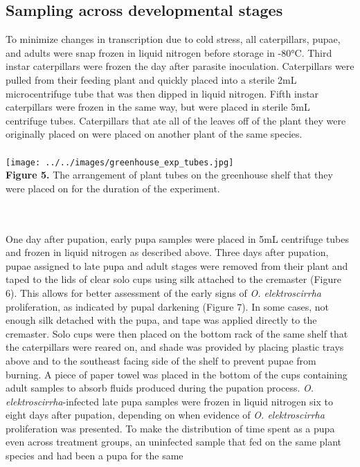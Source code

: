 \documentclass{article}
\begin{document}
\begin{multicols}{2}
    \section{Sampling across developmental stages}
    \indent To minimize changes in transcription due to cold stress, all caterpillars, pupae, and adults were snap frozen in liquid nitrogen before 
    storage in -80°C. Third instar caterpillars were frozen the day after parasite inoculation. Caterpillars were pulled from their feeding plant 
    and quickly placed into a sterile 2mL microcentrifuge tube that was then dipped in liquid nitrogen. Fifth instar caterpillars were frozen in 
    the same way, but were placed in sterile 5mL centrifuge tubes. Caterpillars that ate all of the leaves off of the plant they were originally 
    placed on were placed on another plant of the same species. 
    \\
    \\
    \texttt{[image: ../../images/greenhouse\_exp\_tubes.jpg]} \\
    \caption{\textbf{Figure 5.} The arrangement of plant tubes on the greenhouse shelf that they were placed on for the duration of the experiment.}\\
    \\
    \indent One day after pupation, early pupa samples were placed in 5mL centrifuge tubes and frozen in liquid nitrogen as described above. 
    Three days after pupation, pupae assigned to late pupa and adult stages were removed from their plant and taped to the lids of clear solo cups 
    using silk attached to the cremaster (Figure 6). This allows for better assessment of the early signs of \emph{O. elektroscirrha} proliferation, as indicated by 
    pupal darkening (Figure 7). In some cases, not enough silk detached with the pupa, and tape was applied directly to the cremaster. Solo cups were then 
    placed on the bottom rack of the same shelf that the caterpillars were reared on, and shade was provided by placing plastic trays above and to 
    the southeast facing side of the shelf to prevent pupae from burning. A piece of paper towel was placed in the bottom of the cups containing 
    adult samples to absorb fluids produced during the pupation process. \emph{O. elektroscirrha}-infected late pupa samples were frozen in liquid nitrogen 
    six to eight days after pupation, depending on when evidence of \emph{O. elektroscirrha} proliferation was presented. To make the distribution of 
    time spent as a pupa even across treatment groups, an uninfected sample that fed on the same plant species and had been a pupa for the same 

\end{multicols}
\end{document}
